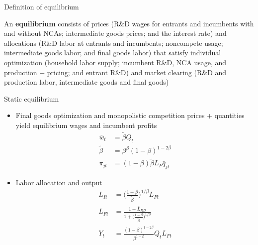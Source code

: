\documentclass[english,usenames,dvipsnames]{beamer}
\begin{document}
\begin{frame}{Definition of equilibrium}\label{definition:equilibrium}\hyperlink{definition:symmetric_bgp}{}
	\begin{definition}
		An \textbf{equilibrium} consists of prices (R\&D wages for entrants and incumbents with and without NCAs; intermediate goods prices; and the interest rate) and allocations (R\&D labor at entrants and incumbents; noncompete usage; intermediate goods labor; and final goods labor) that satisfy individual optimization (household labor supply; incumbent R\&D, NCA usage, and production + pricing; and entrant R\&D) and market clearing (R\&D and production labor, intermediate goods and final goods)
	\end{definition}
\end{frame}


\begin{frame}{Static equilibrium}\label{static_eq_conditions}
	\hyperlink{closing_the_model}{}
	\begin{itemize}
		\small 
		\item Final goods optimization and monopolistic competition prices + quantities yield equilibrium wages and incumbent profits 
		\begin{align*}
			\bar{w}_t &= \tilde{\beta} Q_t \\ 
			\tilde{\beta} &= \beta^{\beta} (1-\beta)^{1-2\beta}  \\
			\pi_{jt} &= (1-\beta) \tilde{\beta} L_F \bar{q}_{jt}
		\end{align*}
		\small
		\item Labor allocation and output
		\begin{align*}
			L_{It} &= \Big( \frac{1-\beta}{\tilde{\beta}} \Big)^{1 / \beta} L_{Ft} \\
			L_{Ft} &= \frac{1 - \bar{L}_{RD}}{1 + \Big(\frac{1-\beta}{\tilde{\beta}}\Big)^{1/\beta}} \\
			Y_t &= \frac{(1-\beta)^{1-2\beta}}{\beta^{1-\beta}} Q_t L_{Ft} 
		\end{align*}
	\end{itemize}
\end{frame}
\end{document}
